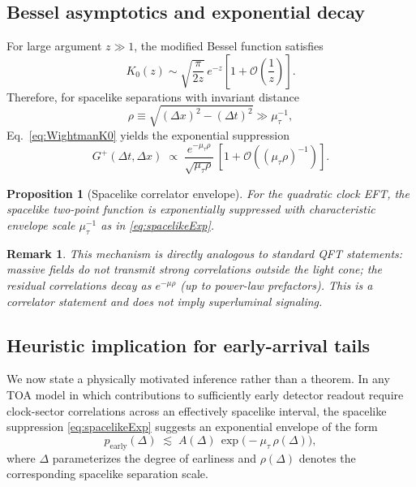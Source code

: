 \documentclass[pdflatex,sn-mathphys-num]{sn-jnl}
\theoremstyle{thmstylethree}
\theoremstyle{thmstyleone}
\newtheorem{proposition}{Proposition}[section]
\theoremstyle{thmstyletwo}
\newtheorem{remark}{Remark}[section]
\numberwithin{equation}{section}
\newcommand{\cO}{\mathcal{O}}
\newcommand{\Gplus}{G^{+}}
\newcommand{\Kzero}{K_{0}}
\begin{document}
    \subsection{Bessel asymptotics and exponential decay}
        
        For large argument $z\gg 1$, the modified Bessel function satisfies
        \begin{equation}
            \Kzero(z)\sim \sqrt{\frac{\pi}{2z}}\,e^{-z}\left[1+\cO\!\left(\frac{1}{z}\right)\right].
            \label{eq:K0asym}
        \end{equation}
        Therefore, for spacelike separations with invariant distance
        \begin{equation}
            \rho \equiv \sqrt{(\Delta x)^2-(\Delta t)^2}\gg \mu_\tau^{-1},
        \end{equation}
        Eq.~\eqref{eq:WightmanK0} yields the exponential suppression
        \begin{equation}
            \Gplus(\Delta t,\Delta x)\;\propto\;
            \frac{e^{-\mu_\tau \rho}}{\sqrt{\mu_\tau \rho}}\,
            \left[1+\cO\!\left((\mu_\tau\rho)^{-1}\right)\right].
            \label{eq:spacelikeExp}
        \end{equation}
        
        \begin{proposition}[Spacelike correlator envelope]
For the quadratic clock EFT, the spacelike two-point function is exponentially suppressed with characteristic envelope scale $\mu_\tau^{-1}$ as in \eqref{eq:spacelikeExp}.
        \end{proposition}
        
        \begin{remark}
            This mechanism is directly analogous to standard QFT statements: massive fields do not transmit strong correlations outside the light cone; the residual correlations decay as $e^{-\mu \rho}$ (up to power-law prefactors). This is a correlator statement and does not imply superluminal signaling.
        \end{remark}
    
    \subsection{Heuristic implication for early-arrival tails}
        
        We now state a physically motivated inference rather than a theorem. In any TOA model in which contributions to sufficiently early detector readout require clock-sector correlations across an effectively spacelike interval, the spacelike suppression \eqref{eq:spacelikeExp} suggests an exponential envelope of the form
        \begin{equation}
            p_{\mathrm{early}}(\Delta)\;\lesssim\;A(\Delta)\,\exp\!\big(-\mu_\tau\,\rho(\Delta)\big),
            \label{eq:earlyBound}
        \end{equation}
        where $\Delta$ parameterizes the degree of earliness and $\rho(\Delta)$ denotes the corresponding spacelike separation scale.
        
\end{document}
